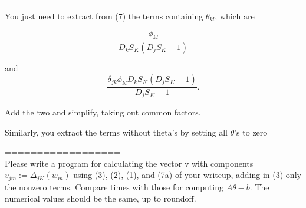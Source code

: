 \documentclass[12pt]{article}
\begin{document}
================== \\
You just need to extract from (7) the terms containing $\theta_{kl}$, which are

\begin{equation}
    \frac{\phi_{kl}}{D_kS_K(D_jS_K-1)}
\end{equation}


and
\begin{equation}
    \frac{\delta_{jk}\phi_{kl}D_kS_K(D_jS_K-1)}{D_jS_K-1}.
\end{equation}


Add the two and simplify, taking out common factors.

Similarly, you extract the terms without theta's by setting all $\theta$'s to zero

================== \\

Please write a program for calculating the vector v with components $v_{jm}:=\Delta_{jK}(w_m)$ using (3), (2), (1), and (7a) of your writeup, adding in (3) only the nonzero terms. Compare times with those for computing $A\theta-b$. The numerical values should be the same, up to roundoff.

\fi
\end{document}
